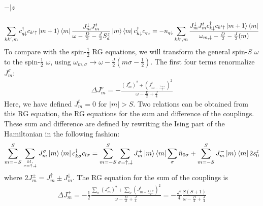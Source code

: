 \documentclass[12pt]{revtex4-2}
\begin{document}
\paragraph{\(-|z\)}
\begin{equation}\begin{aligned}
	\sum_{kk^\prime,m} c^\dagger_{q \downarrow} c_{k^\prime \uparrow} \ket{m+1}\bra{m}\frac{J^\downarrow_{m}{J^t_m}}{\omega - \frac{D}{2} - \frac{J}{2}S_d^z}\ket{m}\bra{m} c^\dagger_{k \downarrow}c_{q \downarrow} = -n_{q \downarrow}\sum_{kk^\prime,m}\frac{J^\downarrow_{m} J^t_m c^\dagger_{k \downarrow}c_{k^\prime\uparrow} \ket{m+1}\bra{m}}{\omega_{m, \downarrow} - \frac{D}{2} - \frac{J}{2}(m)}
\end{aligned}\end{equation}
To compare with the spin-\(\frac{1}{2}\) RG equations, we will transform the general spin-\(S\) \(\omega\) to the spin-\(\frac{1}{2}\) \( \omega\), using \(\omega_{m,\sigma} \to \omega - \frac{J}{2}\left(m\sigma - \frac{1}{2}\right)\).
The first four terms renormalize \(J^\sigma_m\):
\begin{equation}\begin{aligned}
	\Delta J^\sigma_{m} = -\frac{\left( J^\sigma_m \right) ^2 + \left( J^t_{m-\frac{1+\sigma}{2}} \right) ^2}{\omega - \frac{D}{2} + \frac{J}{4}}
\end{aligned}\end{equation}
Here, we have defined \(J^t_m = 0\) for \( |m| > S\). Two relations can be obtained from this RG equation, the RG equations for the sum and difference of the couplings. These sum and difference are defined by rewriting the Ising part of the Hamiltonian in the following fashion:
\begin{equation}\begin{aligned}
	\sum_{m=-S}^S \sum_{kl,\atop{\sigma=\uparrow,\downarrow}} J^\sigma_m \ket{m}\bra{m} c^\dagger_{k \sigma}c_{l \sigma} = \sum_{m=-S}^S \sum_{\sigma=\uparrow,\downarrow} J^+_m \ket{m}\bra{m} \sum_\sigma \hat n_{0\sigma}  + \sum_{m=-S}^S J^-_m \ket{m}\bra{m} 2s^z_0
\end{aligned}\end{equation}
where \(2J^\pm_m = J^\uparrow_m \pm J^\downarrow_m\).
The RG equation for the sum of the couplings is
\begin{equation}\begin{aligned}
	\Delta J^+_m = -\frac{1}{2}\frac{\sum_\sigma \left( J^\sigma_m \right) ^2 + \sum_\sigma \left( J^t_{m-\frac{1+\sigma}{2}} \right) ^2}{\omega - \frac{D}{2} + \frac{J}{4}} = -\frac{J^2}{4}\frac{S(S+1)}{\omega - \frac{D}{2} + \frac{J}{4}}
\end{aligned}\end{equation}
\end{document}
